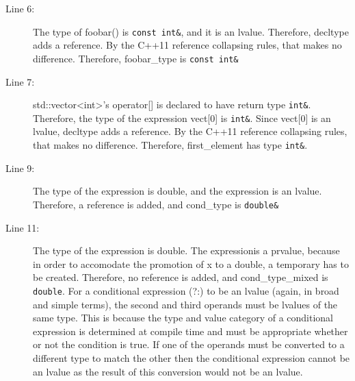 \documentclass[a4paper,11pt,twoside]{book}
\begin{document}
\begin{itemize}
\begin{description}
		\item[Line 6:] The type of foobar() is \texttt{const int\&}, and it is an lvalue. Therefore, decltype adds a reference. By the C++11 reference collapsing rules, that makes no difference. Therefore, foobar\_type is \texttt{const int\&}
		
		\item[Line 7:] std::vector<int>'s operator[] is declared to have return type \texttt{int\&}. Therefore, the type of the expression vect[0] is \texttt{int\&}. Since vect[0] is an lvalue, decltype adds a reference. By the C++11 reference collapsing rules, that makes no difference. Therefore, first\_element has type \texttt{int\&}.  
		
		\item[Line 9:]  The type of the expression is double, and the expression is an lvalue. Therefore, a reference is added, and cond\_type is \texttt{double\&}
		
		\item[Line 11:] The type of the expression is double. The expressionis a prvalue, because in order to accomodate the promotion of x to a double, a temporary has to be created. Therefore, no reference is added, and cond\_type\_mixed is \texttt{double}.  For a conditional expression (?:) to be an lvalue (again, in broad and simple terms), the second and third operands must be lvalues of the same type. This is because the type and value category of a conditional expression is determined at compile time and must be appropriate whether or not the condition is true. If one of the operands must be converted to a different type to match the other then the conditional expression cannot be an lvalue as the result of this conversion would not be an lvalue.
	\end{description}

\end{itemize}
\end{document}
